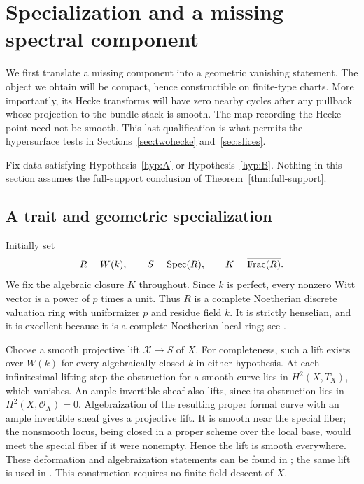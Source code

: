 \section{Specialization and a missing spectral component}
\label{sec:specialization}

We first translate a missing component into a geometric vanishing statement.
The object we obtain will be compact, hence constructible on finite-type
charts.  More importantly, its Hecke transforms will have zero nearby cycles
after any pullback whose projection to the bundle stack is smooth.  The map
recording the Hecke point need not be smooth.  This last qualification is
what permits the hypersurface tests in Sections~\ref{sec:twohecke}
and~\ref{sec:slices}.

Fix data satisfying Hypothesis~\ref{hyp:A} or Hypothesis~\ref{hyp:B}.
Nothing in this section assumes the full-support conclusion of
Theorem~\ref{thm:full-support}.

\subsection{A trait and geometric specialization}

Initially set
\[
 R=W(k),\qquad S=\operatorname{Spec}(R),\qquad
 K=\overline{\operatorname{Frac}(R)}.
\]
We fix the algebraic closure $K$ throughout.  Since $k$ is perfect, every
nonzero Witt vector is a power of $p$ times a unit.  Thus $R$ is a complete
Noetherian discrete valuation ring with uniformizer $p$ and residue field
$k$.  It is strictly henselian, and it is excellent because it is a complete
Noetherian local ring; see \cite[Tag~07QS]{Stacks}.

Choose a smooth projective lift $\mathscr X\to S$ of $X$.
For completeness, such a lift exists over $W(k)$ for every algebraically
closed $k$ in either hypothesis.  At each infinitesimal lifting step the
obstruction for a smooth curve lies in $H^2(X,T_X)$, which vanishes.
An ample invertible sheaf also lifts, since its obstruction lies in
$H^2(X,\mathcal O_X)=0$.  Algebraization of the resulting proper formal
curve with an ample invertible sheaf gives a projective lift.  It is smooth
near the special fiber; the nonsmooth locus, being closed in a proper scheme
over the local base, would meet the special fiber if it were nonempty.
Hence the lift is smooth everywhere.  These deformation and algebraization
statements can be found in \cite[Tags~0DZQ and~0E7R]{Stacks}; the same lift is
used in \cite[\S3.1.1]{GR}.  This construction requires no finite-field
descent of $X$.

